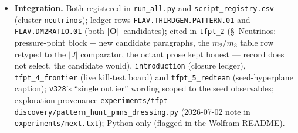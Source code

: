 \documentclass[11pt]{article}
\providecommand{\mO}{\textbf{[O]}}\providecommand{\mX}{\textbf{[X]}}
\begin{document}
\begin{itemize}
(\texttt{v9}/\texttt{v268}/\texttt{v270}, $\delta{=}4\pi/3$) has one canonical derived CP invariant, and
\textbf{[N]} $|J_{\mathrm{PMNS}}|{=}0.029653$ meets the NuFIT~6.0 measured ratio $0.029805\pm0.000792$ at
$-0.19\sigma$ (equivalently $m_2/m_3{=}\sqrt{|J|}{=}0.17220$ vs $0.17264(229)$) --- zero dials.
\textbf{[N]} the informal \texttt{tfpt\_2} table heuristic $m_2/m_3{\sim}\pi\varphi_0{=}0.16704$ (a ``$\sim$''
entry, never frozen) is now $-2.44\sigma$ and is \emph{superseded as the comparator}. \textbf{[C]} spectrum
consistency: $\Sigma m_\nu{=}m_3(1{+}\sqrt{|J|}){=}0.0588$ eV reproduces the documented $0.0586$ eV
(\texttt{v272}); no absolute number is added. \textbf{[O]} no mechanism (the $\mu\tau$ texture gives
$\theta_{13}{=}0$ at leading order). \textbf{[X]} JUNO shrinks the window ${\sim}4\times$; adopting the
\texttt{v467} pattern would shift $|J|\to0.028849$ ($-1.21\sigma$ today) --- the two candidates
\emph{cross-discriminate} at JUNO precision. Python-only.
\item \textbf{Integration.} Both registered in \texttt{run\_all.py} and \texttt{script\_registry.csv}
(cluster \texttt{neutrinos}); ledger rows \texttt{FLAV.THIRDGEN.PATTERN.01} and \texttt{FLAV.DM2RATIO.01}
(both \mO\ candidates); cited in \texttt{tfpt\_2} (\S~Neutrinos: pressure-point block $+$ new candidate
paragraphs, the $m_2/m_3$ table row retyped to the $|J|$ comparator, the octant prose kept honest ---
record does not select, the candidate would), \texttt{introduction} (closure ledger), \texttt{tfpt\_4\_frontier}
(live kill-test board) and \texttt{tfpt\_5\_redteam} (seed-hyperplane caption); \texttt{v328}'s
``single outlier'' wording scoped to the seed observables; exploration provenance
\texttt{experiments/tfpt-discovery/pattern\_hunt\_pmns\_dressing.py} (2026-07-02 note in
\texttt{experiments/next.txt}); Python-only (flagged in the Wolfram README).
\end{itemize}
\end{document}
